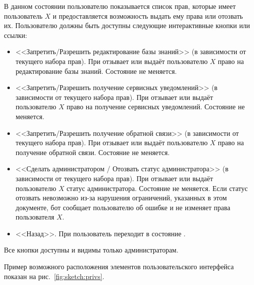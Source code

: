 \begin{enumerate}
            В данном состоянии пользователю показывается список прав, которые имеет пользователь \(X\)
            и предоставляется возможность выдать ему права или отозвать их.
            Пользователю должны быть доступны следующие интерактивные кнопки или ссылки:
            \begin{itemize}
                \item
                    <<Запретить/Разрешить редактирование базы знаний>>
                    (в зависимости от текущего набора прав).
                    При  отзывает или выдаёт пользователю \(X\) право на редактирование
                    базы знаний. Состояние не меняется.
                \item
                    <<Запретить/Разрешить получение сервисных уведомлений>>
                    (в зависимости от текущего набора прав).
                    При  отзывает или выдаёт пользователю \(X\) право на получение
                    сервисных уведомлений. Состояние не меняется.
                \item
                    <<Запретить/Разрешить получение обратной связи>>
                    (в зависимости от текущего набора прав).
                    При  отзывает или выдаёт пользователю \(X\) право на получение
                    обратной связи. Состояние не меняется.
                \item
                    <<Сделать администратором / Отозвать статус администратора>>
                    (в зависимости от текущего набора прав).
                    При  отзывает или выдаёт пользователю \(X\) статус администратора.
                    Состояние не меняется. Если статус отозвать невозможно из-за нарушения ограничений,
                    указанных в этом документе, бот сообщает пользователю об ошибке и не изменяет
                    права пользователя \(X\).
                \item
                    <<Назад>>.
                    При  пользователь переходит в состояние
                    \hyperref[itm:req:ui:states:user-privs]
                    {}.
            \end{itemize}

            Все кнопки доступны и видимы только администраторам.

            Пример возможного расположения элементов пользовательского интерфейса показан на
            рис.~\ref{fig:sketch:privs}.


\end{enumerate}
